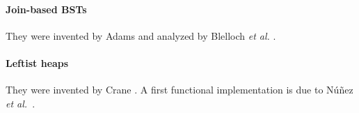 \documentclass[11pt,a4paper]{article}
\begin{document}
\paragraph{Join-based BSTs}
They were invented by Adams \cite{Adams-TR92,Adams-JFP93}
and analyzed by Blelloch \emph{et al.} \cite{BlellochFS-SPAA16}.

\paragraph{Leftist heaps}
They were invented by Crane \cite{Crane72}. A first functional implementation
is due to N\'u\~{n}ez \emph{et al.}~\cite{NunezPP95}.



\end{document}
